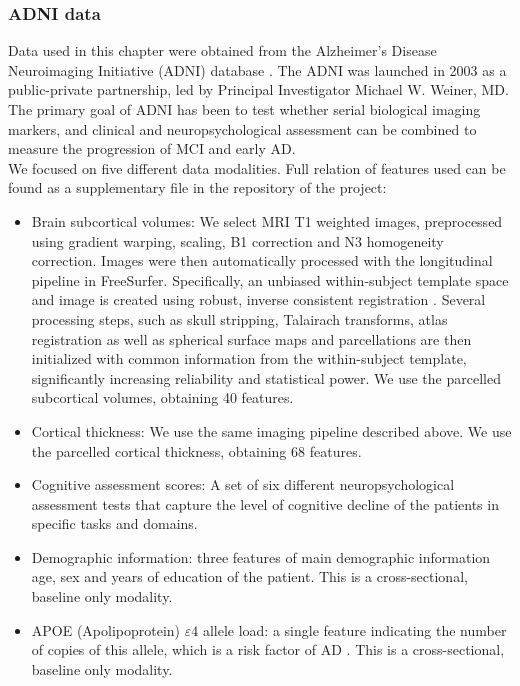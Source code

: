 \subsubsection{ADNI data}

Data used in this chapter were obtained from the Alzheimer’s Disease Neuroimaging Initiative (ADNI) database \cite{Mueller2005}. The ADNI was launched in 2003 as a public-private partnership, led by Principal Investigator Michael W. Weiner, MD. The primary goal of ADNI has been to test whether serial biological imaging markers, and clinical and neuropsychological assessment can be combined to measure the progression of MCI and early AD. \\

We focused on five different data modalities. Full relation of features used can be found as a supplementary file in the repository of the project: \\

\begin{itemize}
    \item Brain subcortical volumes: We select MRI T1 weighted images, preprocessed using gradient warping, scaling, B1 correction and N3 homogeneity correction. Images were then automatically processed with the longitudinal pipeline \cite{Reuter2012} in FreeSurfer. Specifically, an unbiased within-subject template space and image is created using robust, inverse consistent registration \cite{Reuter2010}. Several processing steps, such as skull stripping, Talairach transforms, atlas registration as well as spherical surface maps and parcellations are then initialized with common information from the within-subject template, significantly increasing reliability and statistical power. We use the parcelled subcortical volumes, obtaining 40 features.
    \item Cortical thickness: We use the same imaging pipeline described above. We use the parcelled cortical thickness, obtaining 68 features.
    \item Cognitive assessment scores: A set of six different neuropsychological assessment tests that capture the level of cognitive decline of the patients in specific tasks and domains. 
    \item Demographic information: three features of main demographic information age, sex and years of education of the patient. This is a cross-sectional, baseline only modality.
    \item APOE (Apolipoprotein) $\varepsilon4$ allele load: a single feature indicating the number of copies of this allele, which is a risk factor of AD \cite{Saunders1993}. This is a cross-sectional, baseline only modality.
\end{itemize}

